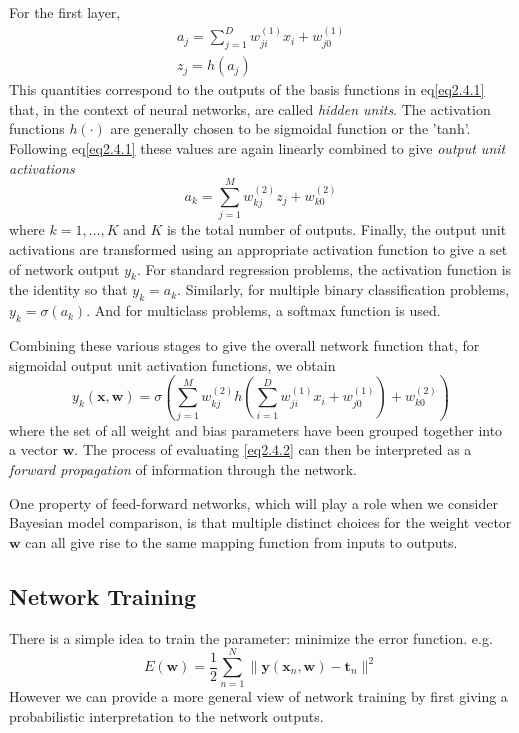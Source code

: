 \documentclass{article}
\newcommand{\mbf}{\mathbf}
\newcommand{\ww}{\mbf w}
\newcommand{\ttt}{\mbf t}
\newcommand{\xx}{\mbf x}
\newcommand{\yy}{\mbf y}
\begin{document}
For the first layer,
\begin{gather}\label{}
a_j=\sum_{j=1}^Dw_{ji}^{(1)}x_i+w_{j0}^{(1)} \\
z_j=h(a_j)
\end{gather}
This quantities correspond to the outputs of the basis functions in eq\ref{eq2.4.1} that, in the context of neural networks, are called \textit{hidden units}. The activation functions $h(\cdot)$  are generally chosen to be sigmoidal function or the 'tanh'. Following eq\ref{eq2.4.1} these values are again linearly combined to give \textit{output unit activations}
\begin{equation}\label{}
  a_k=\sum_{j=1}^{M}w_{kj}^{(2)}z_j+w_{k0}^{(2)}
\end{equation}
where $k=1,\dots,K$ and $K$ is the total number of outputs. Finally, the output unit activations are transformed using an appropriate activation function to give a set of network output $y_k$. For standard regression problems, the activation function is the identity so that $y_k=a_k$. Similarly, for multiple binary classification problems, $y_k =\sigma(a_k)$. And for multiclass problems, a softmax function is used.

Combining these various stages to give the overall network function that, for sigmoidal output unit activation functions, we obtain
\begin{equation}\label{eq2.4.2}
  y_k(\xx,\ww) = \sigma(\sum_{j=1}^{M}w_{kj}^{(2)}h(\sum_{i=1}^{D}w_{ji}^{(1)}x_i+w_{j0}^{(1)})+w_{k0}^{(2)})
\end{equation}
where the set of all weight and bias parameters have been grouped together into a vector $\ww$. The process of evaluating \ref{eq2.4.2} can then be interpreted as a \textit{forward propagation} of information through the network.

One property of feed-forward networks, which will play a role when we consider Bayesian model comparison, is that multiple distinct choices for the weight vector
$\ww$ can all give rise to the same mapping function from inputs to outputs.
\subsection{Network Training}
There is a simple idea to train the parameter: minimize the error function. e.g.
\begin{equation}\label{eq2.4.3}
  E(\ww) = \frac12\sum_{n=1}^N\|\yy(\xx_n,\ww)-\ttt_n\|^2
\end{equation}
However we can provide a more general view of network training by first giving a probabilistic interpretation to the network outputs.
\end{document}

